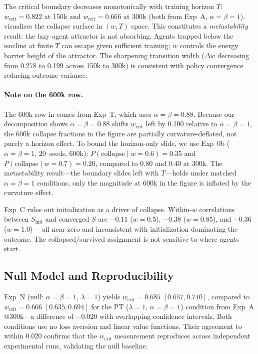 \documentclass[11pt]{article}
\newcommand{\wcrit}{w_{\mathrm{crit}}}
\begin{document}
The critical boundary decreases monotonically with training horizon $T$:
$\wcrit = 0.822$ at 150k and $\wcrit = 0.666$ at 300k (both from Exp~A,
$\alpha{=}\beta{=}1$).
 visualises the collapse surface in $(w, T)$ space.
This constitutes a \emph{metastability} result: the lazy-agent attractor
is not absorbing.
Agents trapped below the isocline at finite $T$ can escape given
sufficient training; $w$ controls the energy barrier height of the
attractor.
The sharpening transition width ($\Delta w$ decreasing from 0.278 to
0.199 across 150k to 300k) is consistent with policy convergence reducing
outcome variance.

\paragraph{Note on the 600k row.}
The 600k row in  comes from Exp~T, which uses
$\alpha{=}\beta{=}0.88$.
Because our decomposition shows $\alpha{=}\beta{=}0.88$ shifts
$\wcrit$ left by 0.100 relative to $\alpha{=}\beta{=}1$, the 600k
collapse fractions in the figure are partially curvature-deflated, not
purely a horizon effect.
To bound the horizon-only slide, we use Exp~0b ($\alpha{=}\beta{=}1$,
20~seeds, 600k): $P(\mathrm{collapse}\mid w{=}0.6) = 0.35$ and
$P(\mathrm{collapse}\mid w{=}0.7) = 0.20$, compared to 0.80 and 0.40
at 300k.
The metastability result---the boundary slides left with $T$---holds
under matched $\alpha{=}\beta{=}1$ conditions; only the magnitude at
600k in the figure is inflated by the curvature effect.

Exp~C rules out initialization as a driver of collapse.
Within-$w$ correlations between $S_{\mathrm{init}}$ and converged $S$
are $-0.11$ ($w{=}0.5$), $-0.38$ ($w{=}0.85$), and $-0.36$ ($w{=}1.0$)---
all near zero and inconsistent with initialization dominating the outcome.
The collapsed/survived assignment is not sensitive to where agents start.

\subsection{Null Model and Reproducibility}
\label{sec:results_null}

Exp~N (null: $\alpha{=}\beta{=}1$, $\lambda{=}1$) yields
$\wcrit = 0.685$ $[0.657, 0.710]$, compared to $\wcrit = 0.666$
$[0.635, 0.694]$ for the PT ($\lambda{=}1$, $\alpha{=}\beta{=}1$) condition
from Exp~A @300k---a difference of $-0.020$ with overlapping confidence
intervals.
Both conditions use no loss aversion and linear value functions.
Their agreement to within 0.020 confirms that the $\wcrit$ measurement
reproduces across independent experimental runs, validating the null
baseline.
\end{document}
